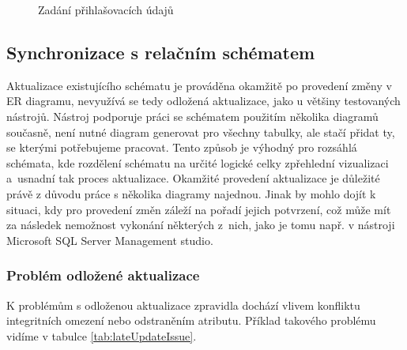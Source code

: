 \documentclass[czech,bachelor,public,dept460,male,oneside]{diploma}
\begin{document}
	\begin{figure}[!h]
		\centering
		\qquad
		\caption{Zadání přihlašovacích údajů}
	\end{figure}
	
	\subsection{Synchronizace s relačním schématem}
	Aktualizace existujícího schématu je prováděna okamžitě po provedení změny v ER diagramu, nevyužívá se tedy odložená aktualizace, jako u většiny testovaných nástrojů. Nástroj podporuje práci se schématem použitím několika diagramů současně, není nutné diagram generovat pro všechny tabulky, ale stačí přidat ty, se kterými potřebujeme pracovat. Tento způsob je výhodný pro rozsáhlá schémata, kde rozdělení schématu na určité logické celky zpřehlední vizualizaci a~usnadní tak proces aktualizace. Okamžité provedení aktualizace je důležité právě z důvodu práce s několika diagramy najednou. Jinak by mohlo dojít k situaci, kdy pro provedení změn záleží na pořadí jejich potvrzení, což může mít za následek nemožnost vykonání některých z~nich, jako je tomu např. v nástroji Microsoft SQL Server Management studio. 
	
		\subsubsection{Problém odložené aktualizace}
		K problémům s odloženou aktualizace zpravidla dochází vlivem konfliktu integritních omezení nebo odstraněním atributu. Příklad takového problému vidíme v tabulce \ref{tab:lateUpdateIssue}.
				
\end{document}
